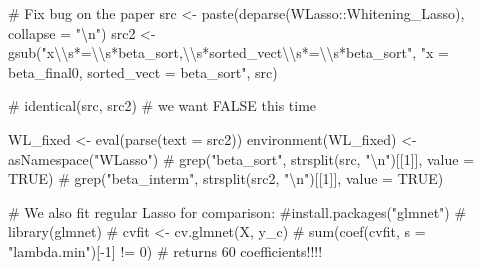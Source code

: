 \documentclass[
  letterpaper,
  DIV=11,
  numbers=noendperiod]{scrartcl}
\newenvironment{Shaded}{\begin{snugshade}}{\end{snugshade}}
\newcommand{\AttributeTok}[1]{\textcolor[rgb]{0.40,0.45,0.13}{#1}}
\newcommand{\CommentTok}[1]{\textcolor[rgb]{0.37,0.37,0.37}{#1}}
\newcommand{\FunctionTok}[1]{\textcolor[rgb]{0.28,0.35,0.67}{#1}}
\newcommand{\NormalTok}[1]{\textcolor[rgb]{0.00,0.23,0.31}{#1}}
\newcommand{\OtherTok}[1]{\textcolor[rgb]{0.00,0.23,0.31}{#1}}
\newcommand{\SpecialCharTok}[1]{\textcolor[rgb]{0.37,0.37,0.37}{#1}}
\newcommand{\StringTok}[1]{\textcolor[rgb]{0.13,0.47,0.30}{#1}}
\begin{document}
\begin{Shaded}
\begin{Highlighting}[]
\CommentTok{\# Fix bug on the paper}
\NormalTok{src }\OtherTok{\textless{}{-}} \FunctionTok{paste}\NormalTok{(}\FunctionTok{deparse}\NormalTok{(WLasso}\SpecialCharTok{::}\NormalTok{Whitening\_Lasso), }\AttributeTok{collapse =} \StringTok{"}\SpecialCharTok{\textbackslash{}n}\StringTok{"}\NormalTok{)}
\NormalTok{src2 }\OtherTok{\textless{}{-}} \FunctionTok{gsub}\NormalTok{(}\StringTok{"x}\SpecialCharTok{\textbackslash{}\textbackslash{}}\StringTok{s*=}\SpecialCharTok{\textbackslash{}\textbackslash{}}\StringTok{s*beta\_sort,}\SpecialCharTok{\textbackslash{}\textbackslash{}}\StringTok{s*sorted\_vect}\SpecialCharTok{\textbackslash{}\textbackslash{}}\StringTok{s*=}\SpecialCharTok{\textbackslash{}\textbackslash{}}\StringTok{s*beta\_sort"}\NormalTok{,}
             \StringTok{"x = beta\_final0, sorted\_vect = beta\_sort"}\NormalTok{, src)}

\CommentTok{\# identical(src, src2)   \# we want FALSE this time}

\NormalTok{WL\_fixed }\OtherTok{\textless{}{-}} \FunctionTok{eval}\NormalTok{(}\FunctionTok{parse}\NormalTok{(}\AttributeTok{text =}\NormalTok{ src2))}
\FunctionTok{environment}\NormalTok{(WL\_fixed) }\OtherTok{\textless{}{-}} \FunctionTok{asNamespace}\NormalTok{(}\StringTok{"WLasso"}\NormalTok{)}
\CommentTok{\# grep("beta\_sort", strsplit(src, "\textbackslash{}n")[[1]], value = TRUE)}
\CommentTok{\# grep("beta\_interm", strsplit(src2, "\textbackslash{}n")[[1]], value = TRUE)}
\end{Highlighting}
\end{Shaded}

\begin{Shaded}
\end{Shaded}

\begin{Shaded}
\begin{Highlighting}[]
\CommentTok{\# We also fit regular Lasso for comparison:}
\CommentTok{\#install.packages("glmnet")}
\CommentTok{\# library(glmnet)}
\CommentTok{\# cvfit \textless{}{-} cv.glmnet(X, y\_c)}
\CommentTok{\# sum(coef(cvfit, s = "lambda.min")[{-}1] != 0)}
\CommentTok{\# returns 60 coefficients!!!!}
\end{Highlighting}
\end{Shaded}
\end{document}
